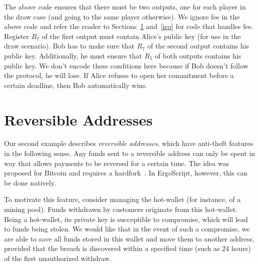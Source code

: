 \documentclass[runningheads]{llncs}
\newcommand{\langname}{ErgoScript\xspace}
\begin{document}
The above code ensures that there must be two outputs, one for each player in the draw case (and going to the same player otherwise). We ignore fee in the above code and refer the reader to Sections~\ref{reversible} and~\ref{ico} for code that handles fee. Register $R_7$ of the first output must contain Alice's public key (for use in the draw scenario). Bob has to make sure that $R_7$ of the second output contains his public key. Additionally, he must ensure that $R_5$ of both outputs contains his public key. We don't encode these conditions here because if Bob doesn't follow the protocol, he will lose. If Alice refuses to open her commitment before a certain deadline, then Bob automatically wins. 

\section{Reversible Addresses}
\label{reversible}
Our second example describes {\em reversible addresses}, which have anti-theft features in the following sense. 
Any funds sent to a reversible address can only be spent in way that allows payments to be reversed for a certain time. The idea was proposed for Bitcoin and requires a hardfork~\cite{raddress}. In \langname, however, this can be done natively.

To motivate this feature, consider managing the hot-wallet (for instance, of a mining pool). Funds withdrawn by customers originate from this hot-wallet. Being a hot-wallet, its private key is succeptible to compromise, which will lead to funds being stolen. %
We would like that in the event of such a compromise, we are able to save all funds stored in this wallet and move them to another address, provided that the breach is discovered within a specified time (such as 24 hours) of the first unauthorized withdraw. 

\end{document}
